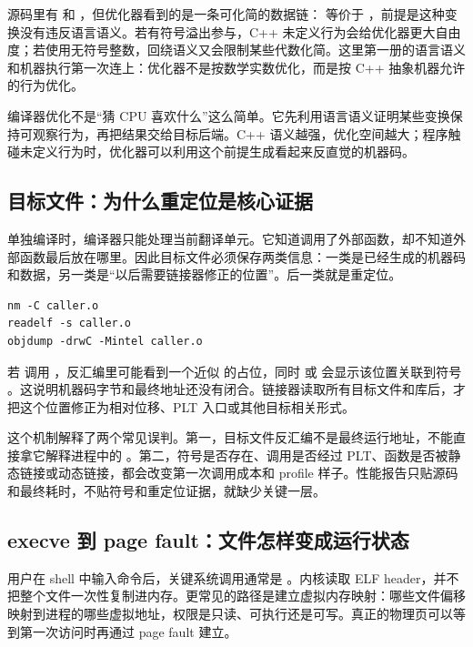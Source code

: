 源码里有  和 ，但优化器看到的是一条可化简的数据链： 等价于 ，前提是这种变换没有违反语言语义。若有符号溢出参与，C++ 未定义行为会给优化器更大自由度；若使用无符号整数，回绕语义又会限制某些代数化简。这里第一册的语言语义和机器执行第一次连上：优化器不是按数学实数优化，而是按 C++ 抽象机器允许的行为优化。

\begin{keyidea}
编译器优化不是“猜 CPU 喜欢什么”这么简单。它先利用语言语义证明某些变换保持可观察行为，再把结果交给目标后端。C++ 语义越强，优化空间越大；程序触碰未定义行为时，优化器可以利用这个前提生成看起来反直觉的机器码。
\end{keyidea}

\subsection{目标文件：为什么重定位是核心证据}

单独编译时，编译器只能处理当前翻译单元。它知道调用了外部函数，却不知道外部函数最后放在哪里。因此目标文件必须保存两类信息：一类是已经生成的机器码和数据，另一类是“以后需要链接器修正的位置”。后一类就是重定位。

\begin{lstlisting}[numbers=none,caption={目标文件阶段的三类证据}]
nm -C caller.o
readelf -s caller.o
objdump -drwC -Mintel caller.o
\end{lstlisting}

若  调用 ，反汇编里可能看到一个近似  的占位，同时  或  会显示该位置关联到符号 。这说明机器码字节和最终地址还没有闭合。链接器读取所有目标文件和库后，才把这个位置修正为相对位移、PLT 入口或其他目标相关形式。

这个机制解释了两个常见误判。第一，目标文件反汇编不是最终运行地址，不能直接拿它解释进程中的 。第二，符号是否存在、调用是否经过 PLT、函数是否被静态链接或动态链接，都会改变第一次调用成本和 profile 样子。性能报告只贴源码和最终耗时，不贴符号和重定位证据，就缺少关键一层。

\subsection{execve 到 page fault：文件怎样变成运行状态}

用户在 shell 中输入命令后，关键系统调用通常是 。内核读取 ELF header，并不把整个文件一次性复制进内存。更常见的路径是建立虚拟内存映射：哪些文件偏移映射到进程的哪些虚拟地址，权限是只读、可执行还是可写。真正的物理页可以等到第一次访问时再通过 page fault 建立。

